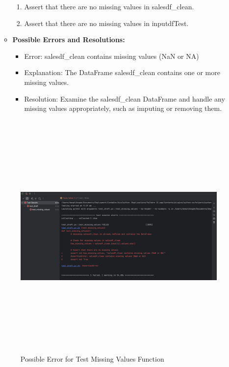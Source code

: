 \begin{enumerate}
\begin{itemize}
\begin{enumerate}
						\item Assert that there are no missing values in salesdf\_clean.
						
						\item Assert that there are no missing values in inputdfTest.
												
				\end{enumerate}
				
				\item \textbf{Possible Errors and Resolutions:}
				
				\begin{itemize}
					
					\item Error: salesdf\_clean contains missing values (NaN or NA)
					
					\item Explanation: The DataFrame salesdf\_clean contains one or more missing values.
					
					\item Resolution: Examine the salesdf\_clean DataFrame and handle any missing values appropriately, such as imputing or removing them.
					
				\end{itemize}
				
			\end{itemize}
		
			\begin{center}
				\begin{figure}[h!]
					\begin{center}
						\includegraphics[height=125mm, width=130mm]{Images/TestmsValues}
					\end{center}
					\caption{ Possible Error for Test Missing Values Function }
				\end{figure}
			\end{center}
		

\end{enumerate}
